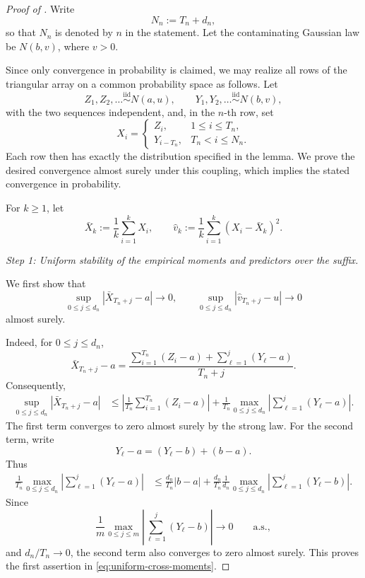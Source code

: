 \documentclass[12pt]{article}
\theoremstyle{spaced}
\theoremstyle{remark}
\begin{document}
\begin{proof}[Proof of ]
Write
\[
N_n:=T_n+d_n,
\]
so that \(N_n\) is denoted by \(n\) in the statement.  Let the
contaminating Gaussian law be \(N(b,v)\), where \(v>0\).

Since only convergence in probability is claimed, we may realize all
rows of the triangular array on a common probability space as follows.
Let
\[
Z_1,Z_2,\ldots \stackrel{\mathrm{iid}}{\sim} N(a,u),
\qquad
Y_1,Y_2,\ldots \stackrel{\mathrm{iid}}{\sim} N(b,v),
\]
with the two sequences independent, and, in the \(n\)-th row, set
\[
X_i=
\begin{cases}
Z_i, & 1\le i\le T_n,\\
Y_{i-T_n}, & T_n<i\le N_n.
\end{cases}
\]
Each row then has exactly the distribution specified in the lemma.
We prove the desired convergence almost surely under this coupling,
which implies the stated convergence in probability.

For \(k\ge1\), let
\[
\bar X_k:=\frac1k\sum_{i=1}^k X_i,
\qquad
\widehat v_k
:=
\frac1k\sum_{i=1}^k(X_i-\bar X_k)^2.
\]

\medskip
\noindent
\textit{Step 1: Uniform stability of the empirical moments and
predictors over the suffix.}

We first show that
\begin{equation}
\label{eq:uniform-cross-moments}
\sup_{0\le j\le d_n}
\left|\bar X_{T_n+j}-a\right|
\longrightarrow0,
\qquad
\sup_{0\le j\le d_n}
\left|\widehat v_{T_n+j}-u\right|
\longrightarrow0
\end{equation}
almost surely.

Indeed, for \(0\le j\le d_n\),
\[
\bar X_{T_n+j}-a
=
\frac{
\sum_{i=1}^{T_n}(Z_i-a)
+
\sum_{\ell=1}^{j}(Y_\ell-a)
}{
T_n+j
}.
\]
Consequently,
\begin{align*}
\sup_{0\le j\le d_n}
|\bar X_{T_n+j}-a|
&\le
\left|
\frac1{T_n}\sum_{i=1}^{T_n}(Z_i-a)
\right|
+
\frac1{T_n}
\max_{0\le j\le d_n}
\left|
\sum_{\ell=1}^{j}(Y_\ell-a)
\right|.
\end{align*}
The first term converges to zero almost surely by the strong law.  For
the second term, write
\[
Y_\ell-a=(Y_\ell-b)+(b-a).
\]
Thus
\begin{align*}
\frac1{T_n}
\max_{0\le j\le d_n}
\left|
\sum_{\ell=1}^{j}(Y_\ell-a)
\right|
&\le
\frac{d_n}{T_n}|b-a|
+
\frac{d_n}{T_n}
\frac1{d_n}
\max_{0\le j\le d_n}
\left|
\sum_{\ell=1}^{j}(Y_\ell-b)
\right|.
\end{align*}
Since
\[
\frac1m
\max_{0\le j\le m}
\left|
\sum_{\ell=1}^{j}(Y_\ell-b)
\right|
\longrightarrow0
\qquad\text{a.s.},
\]
and \(d_n/T_n\to0\), the second term also converges to zero almost
surely.  This proves the first assertion in
\eqref{eq:uniform-cross-moments}.


\end{proof}
\end{document}
